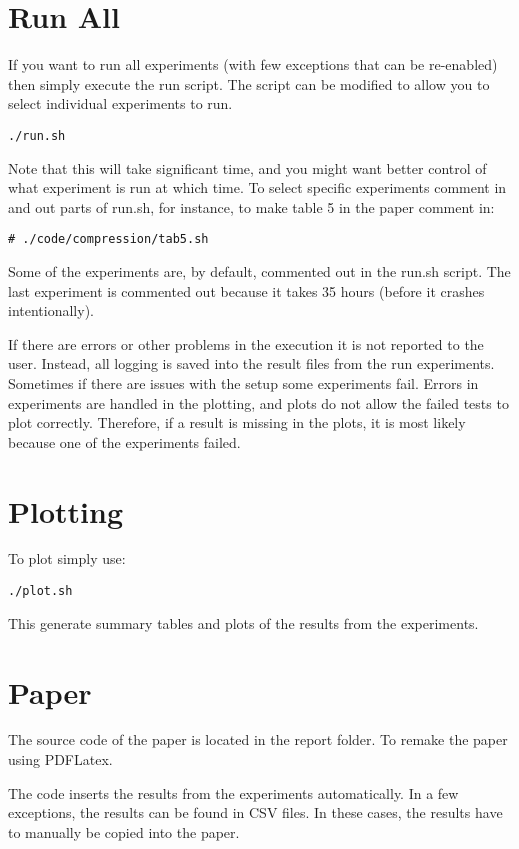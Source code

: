 \documentclass{readme}
\begin{document}
\newpage

\section{Run All}

If you want to run all experiments (with few exceptions that can be re-enabled)
then simply execute the run script. The script can be modified
to allow you to select individual experiments to run.

\begin{lstlisting}
./run.sh
\end{lstlisting}

Note that this will take significant time, and you might want
better control of what experiment is run at which time.
To select specific experiments comment in and out parts of
run.sh, for instance, to make table 5 in the paper comment in:

\begin{lstlisting}
# ./code/compression/tab5.sh
\end{lstlisting}

Some of the experiments are, by default, commented out in the run.sh script.
The last experiment is commented out because it takes 35 hours (before it crashes intentionally).

If there are errors or other problems in the execution it is not reported
to the user. Instead, all logging is saved into the result files from the
run experiments. Sometimes if there are issues with the setup some
experiments fail. Errors in experiments are handled in the plotting, and plots do not allow the failed tests to plot correctly. Therefore, if a result is
missing in the plots, it is most likely because one of the experiments
failed.


\newpage

\section{Plotting}

To plot simply use:

\begin{lstlisting}
./plot.sh
\end{lstlisting}

This generate summary tables and plots of the results from the experiments.

\section{Paper}

The source code of the paper is located in the report folder. To
remake the paper using PDFLatex.

The code inserts the results from the experiments automatically. In a few exceptions, the results can be found in CSV files. In these cases, the results have to manually be copied into the paper.
\end{document}

